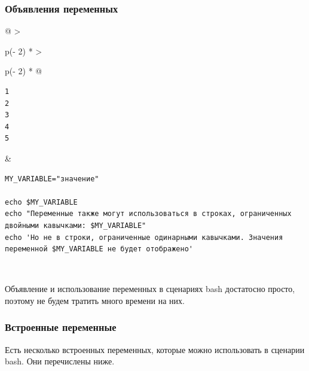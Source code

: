 \documentclass{article}
\begin{document}
\hypertarget{Variable-declarations}{%
\subsubsection{\texorpdfstring{\protect\hyperlink{Variable-declarations}{}Объявления
переменных}{Объявления переменных}}\label{Variable-declarations}}

\begin{longtable}[]{@{}
  >{\raggedright\arraybackslash}p{(\columnwidth - 2\tabcolsep) * }
  >{\raggedright\arraybackslash}p{(\columnwidth - 2\tabcolsep) * }@{}}
\toprule
\endhead
\begin{minipage}[t]{\linewidth}\raggedright
\begin{verbatim}
1
2
3
4
5
\end{verbatim}
\end{minipage} & \begin{minipage}[t]{\linewidth}\raggedright
\begin{verbatim}
MY_VARIABLE="значение"

echo $MY_VARIABLE
echo "Переменные также могут использоваться в строках, ограниченных двойными кавычками: $MY_VARIABLE"
echo 'Но не в строки, ограниченные одинарными кавычками. Значения переменной $MY_VARIABLE не будет отображено'
\end{verbatim}
\end{minipage} \\ \addlinespace
\bottomrule
\end{longtable}

Объявление и использование переменных в сценариях bash достатосно
просто, поэтому не будем тратить много времени на них.

\hypertarget{Built-In-Variables}{%
\subsubsection{\texorpdfstring{\protect\hyperlink{Built-In-Variables}{}Встроенные
переменные}{Встроенные переменные}}\label{Built-In-Variables}}

Есть несколько встроенных переменных, которые можно использовать в
сценарии bash. Они перечислены ниже.
\end{document}
